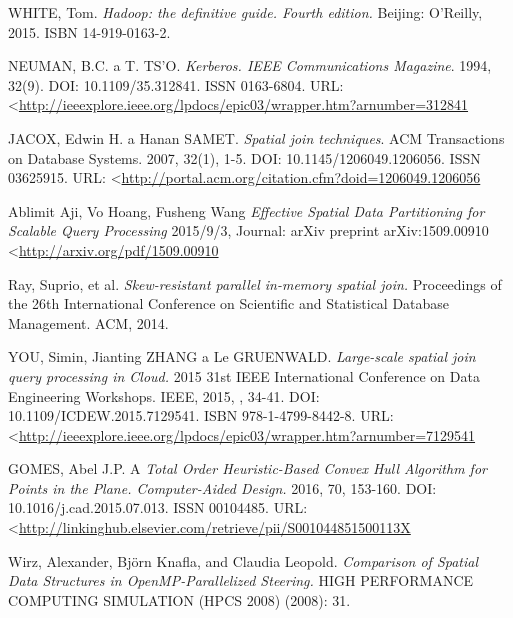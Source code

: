 \documentclass[a4paper,12pt,oneside]{report}
\renewcommand\baselinestretch{1.3}
\begin{document}
\newpage
\renewcommand\baselinestretch{1.2}
\selectfont
\renewcommand{\refname}{References}
\addcontentsline{toc}{section}{ \refname}

\begin{thebibliography}{99}
\label{References}



WHITE, Tom. \textit{Hadoop: the definitive guide. Fourth edition.} Beijing: O'Reilly, 2015. ISBN 14-919-0163-2.

NEUMAN, B.C. a T. TS'O. \textit{Kerberos. IEEE Communications Magazine}. 1994, 32(9). DOI: 10.1109/35.312841. ISSN 0163-6804.  URL: \textless\url{http://ieeexplore.ieee.org/lpdocs/epic03/wrapper.htm?arnumber=312841}


JACOX, Edwin H. a Hanan SAMET. \textit{Spatial join techniques}. ACM Transactions on Database Systems. 2007, 32(1), 1-5. DOI: 10.1145/1206049.1206056. ISSN 03625915. URL: \textless\url{http://portal.acm.org/citation.cfm?doid=1206049.1206056}

Ablimit Aji, Vo Hoang, Fusheng Wang \textit{Effective Spatial Data Partitioning for Scalable Query Processing} 2015/9/3,
Journal: arXiv preprint arXiv:1509.00910 \textless\url{http://arxiv.org/pdf/1509.00910}

Ray, Suprio, et al. \textit{Skew-resistant parallel in-memory spatial join.} Proceedings of the 26th International Conference on Scientific and Statistical Database Management. ACM, 2014.

YOU, Simin, Jianting ZHANG a Le GRUENWALD. \textit{Large-scale spatial join query processing in Cloud.} 2015 31st IEEE International Conference on Data Engineering Workshops. IEEE, 2015, , 34-41. DOI: 10.1109/ICDEW.2015.7129541. ISBN 978-1-4799-8442-8. URL: \textless\url{http://ieeexplore.ieee.org/lpdocs/epic03/wrapper.htm?arnumber=7129541}

GOMES, Abel J.P. A \textit{Total Order Heuristic-Based Convex Hull Algorithm for Points in the Plane. Computer-Aided Design.} 2016, 70, 153-160. DOI: 10.1016/j.cad.2015.07.013. ISSN 00104485.  URL: \textless\url{http://linkinghub.elsevier.com/retrieve/pii/S001044851500113X}

Wirz, Alexander, Björn Knafla, and Claudia Leopold. \textit{Comparison of Spatial Data Structures in OpenMP-Parallelized Steering.} HIGH PERFORMANCE COMPUTING  SIMULATION (HPCS 2008) (2008): 31.


\end{thebibliography}
\end{document}
